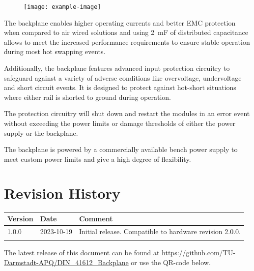 \documentclass[10pt]{datasheet}
\begin{document}
\begin{figure}[ht]
    \centering
    \texttt{[image: example-image]}
\end{figure}

The backplane enables higher operating currents and better EMC protection when compared to air wired solutions and using \qty{2}{\milli\farad} of distributed capacitance allows to meet the increased performance requirements to ensure stable operation during most hot swapping events.

Additionally, the backplane features advanced input protection circuitry to safeguard against a variety of adverse conditions like overvoltage, undervoltage and short circuit events. It is designed to protect against hot-short situations where either rail is shorted to ground during operation.

The protection circuitry will shut down and restart the modules in an error event without exceeding the power limits or damage thresholds of either the power supply or the backplane.

The backplane is powered by a commercially available bench power supply to meet custom power limits and give a high degree of flexibility.

\vfill\break

\onecolumn

\section{Revision History}
\begin{table}[h]
    \centering
    \begin{tabularx}{\textwidth}{l| l | >{\raggedright\arraybackslash}X}
        \thickhline
        Version& Date& Comment\\
        \hline
        1.0.0 &2023-10-19 & Initial release. Compatible to hardware revision 2.0.0.\\
        \thickhline
    \end{tabularx}
\end{table}

The latest release of this document can be found at \url{https://github.com/TU-Darmstadt-APQ/DIN_41612_Backplane} or use the QR-code below.

\begin{center}
\end{center}
\end{document}
